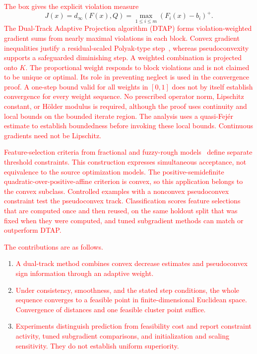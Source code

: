 \documentclass[]{interact}
\theoremstyle{plain}
\theoremstyle{definition}
\theoremstyle{remark}
\newcommand{\dtap}{\textsc{DTAP}}
\begin{document}
\leavevmode\textcolor{red}{The box gives the explicit violation measure}
\[
J(x)=d_\infty(F(x),Q)=\max_{1\le i\le m}(F_i(x)-b_i)^+.
\]
\leavevmode\textcolor{red}{The Dual-Track Adaptive Projection algorithm (\dtap) forms violation-weighted gradient sums from nearly maximal violations in each block. Convex gradient inequalities justify a residual-scaled Polyak-type step~\citep{polyak1969,lopez2012}, whereas pseudoconvexity supports a safeguarded diminishing step. A weighted combination is projected onto $K$. The proportional weight responds to block violations and is not claimed to be unique or optimal. Its role in preventing neglect is used in the convergence proof. A one-step bound valid for all weights in $[0,1]$ does not by itself establish convergence for every weight sequence. No prescribed operator norm, Lipschitz constant, or H\"older modulus is required, although the proof uses continuity and local bounds on the bounded iterate region. The analysis uses a quasi-Fej\'er estimate to establish boundedness before invoking these local bounds. Continuous gradients need not be Lipschitz.}

\leavevmode\textcolor{red}{Feature-selection criteria from fractional and fuzzy-rough models~\citep{wang2021fractional,wang2026afrsfcv} define separate threshold constraints. This construction expresses simultaneous acceptance, not equivalence to the source optimization models. The positive-semidefinite quadratic-over-positive-affine criterion is convex, so this application belongs to the convex subclass. Controlled examples with a nonconvex pseudoconvex constraint test the pseudoconvex track. Classification scores feature selections that are computed once and then reused, on the same holdout split that was fixed when they were computed, and tuned subgradient methods can match or outperform DTAP.}

\leavevmode\textcolor{red}{The contributions are as follows.}
\begin{enumerate}[label=\textbf{C\arabic*.},leftmargin=2.4em,itemsep=3pt]
\item \leavevmode\textcolor{red}{A dual-track method combines convex decrease estimates and pseudoconvex sign information through an adaptive weight.}
\item \leavevmode\textcolor{red}{Under consistency, smoothness, and the stated step conditions, the whole sequence converges to a feasible point in finite-dimensional Euclidean space. Convergence of distances and one feasible cluster point suffice.}
\item \leavevmode\textcolor{red}{Experiments distinguish prediction from feasibility cost and report constraint activity, tuned subgradient comparisons, and initialization and scaling sensitivity. They do not establish uniform superiority.}
\end{enumerate}
\end{document}
